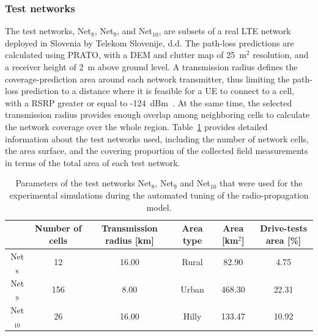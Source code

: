 \bigskip{}



\subsubsection*{Test networks}

The test networks, Net$_{8}$, Net$_{9}$, and Net$_{10}$, are subsets
of a real LTE network deployed in Slovenia by Telekom Slovenije, d.d.
The path-loss predictions are calculated using PRATO, with a DEM and
clutter map of 25~m$^{2}$ resolution, and a receiver height of 2~m
above ground level. A transmission radius defines the coverage-prediction
area around each network transmitter, thus limiting the path-loss
prediction to a distance where it is feasible for a UE to connect
to a cell, with a RSRP greater or equal to -124~dBm~\cite{Neuland_Influence_of_Different_Factors_on_X_Map_Estimation_in_LTE:2011}.
At the same time, the selected transmission radius provides enough
overlap among neighboring cells to calculate the network coverage
over the whole region. Table~\ref{tab:05-Test_network_properties}
provides detailed information about the test networks used, including
the number of network cells, the area surface, and the covering proportion
of the collected field measurements in terms of the total area of
each test network.

\begin{table}
\centering

\caption{Parameters of the test networks Net$_{8}$, Net$_{9}$ and Net$_{10}$
that were used for the experimental simulations during the automated
tuning of the radio-propagation model.\label{tab:05-Test_network_properties}}


{\footnotesize{}}%
\begin{tabular}{cccccc}
\cline{2-6} 
 & {\footnotesize{Number of cells }} & {\footnotesize{Transmission radius {[}km{]}}} & {\footnotesize{Area type}} & {\footnotesize{Area {[}km$^{2}${]}}} & {\footnotesize{Drive-tests area {[}\%{]}}}\tabularnewline
\hline 
{\footnotesize{Net$_{8}$ }} & {\footnotesize{12}} & {\footnotesize{16.00}} & {\footnotesize{Rural}} & {\footnotesize{82.90}} & {\footnotesize{4.75}}\tabularnewline
{\footnotesize{Net$_{9}$ }} & {\footnotesize{156 }} & {\footnotesize{8.00}} & {\footnotesize{Urban}} & {\footnotesize{468.30}} & {\footnotesize{22.31}}\tabularnewline
{\footnotesize{Net$_{10}$ }} & {\footnotesize{26 }} & {\footnotesize{16.00}} & {\footnotesize{Hilly}} & {\footnotesize{133.47}} & {\footnotesize{10.92}}\tabularnewline
\hline 
\end{tabular}
\end{table}



